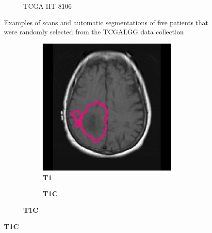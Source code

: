 \begin{subappendices}
\begin{figure}[htbp]
\begin{subfigure}[b]{0.8\textwidth}
\begin{subfigure}[b]{0.215\textwidth}
        \end{subfigure}
        \caption{TCGA-HT-8106}
    \end{subfigure}
    \caption{Examples of scans and automatic segmentations of five patients that were randomly selected from the \acrshort{TCGALGG} data collection}\label{fig:seg_examples_LGG}
\end{figure}


\begin{figure}[htbp]
    \centering
    \begin{subfigure}[b]{0.8\textwidth}
        \centering
        \hfill
        \begin{subfigure}[b]{0.215\textwidth}
        \caption*{\normalfont \textbf{\acrshort{T1}}\nopunct}
        \includegraphics[width=\textwidth, clip, trim=2.5cm 0.5cm 2.5cm 0.5cm]{Figures/Random_segs/T1_TCGA-02-0037.png}
        \end{subfigure}
        \hfill
        \begin{subfigure}[b]{0.215\textwidth}
        \caption*{\normalfont \textbf{\acrshort{T1C}}\nopunct}

\end{subfigure}
\end{subfigure}
\end{figure}
\end{subappendices}
